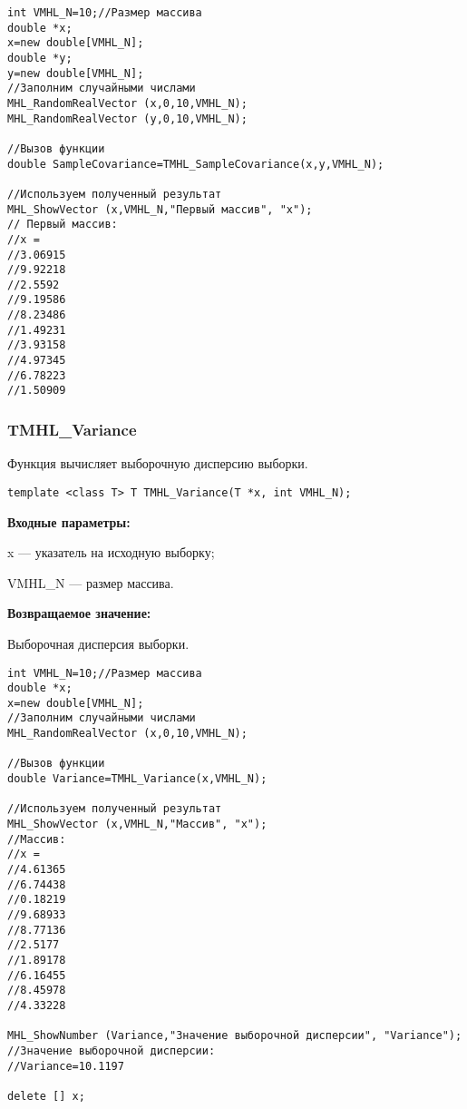 \documentclass[a4paper,12pt]{article}
\begin{document}
\begin{lstlisting}[label=code_use_TMHL_SampleCovariance,caption=Пример использования]
int VMHL_N=10;//Размер массива
double *x;
x=new double[VMHL_N];
double *y;
y=new double[VMHL_N];
//Заполним случайными числами
MHL_RandomRealVector (x,0,10,VMHL_N);
MHL_RandomRealVector (y,0,10,VMHL_N);

//Вызов функции
double SampleCovariance=TMHL_SampleCovariance(x,y,VMHL_N);

//Используем полученный результат
MHL_ShowVector (x,VMHL_N,"Первый массив", "x");
// Первый массив:
//x =
//3.06915
//9.92218
//2.5592
//9.19586
//8.23486
//1.49231
//3.93158
//4.97345
//6.78223
//1.50909
\end{lstlisting}

\subsubsection{TMHL\_Variance}\label{TMHL_Variance}

Функция вычисляет выборочную дисперсию выборки.


\begin{lstlisting}[label=code_syntax_TMHL_Variance,caption=Синтаксис]
template <class T> T TMHL_Variance(T *x, int VMHL_N);
\end{lstlisting}

\textbf{Входные параметры:}
 
x --- указатель на исходную выборку;
 
VMHL\_N --- размер массива.

\textbf{Возвращаемое значение:}
 
Выборочная дисперсия выборки.


\begin{lstlisting}[label=code_use_TMHL_Variance,caption=Пример использования]
int VMHL_N=10;//Размер массива
double *x;
x=new double[VMHL_N];
//Заполним случайными числами
MHL_RandomRealVector (x,0,10,VMHL_N);

//Вызов функции
double Variance=TMHL_Variance(x,VMHL_N);

//Используем полученный результат
MHL_ShowVector (x,VMHL_N,"Массив", "x");
//Массив:
//x =
//4.61365
//6.74438
//0.18219
//9.68933
//8.77136
//2.5177
//1.89178
//6.16455
//8.45978
//4.33228

MHL_ShowNumber (Variance,"Значение выборочной дисперсии", "Variance");
//Значение выборочной дисперсии:
//Variance=10.1197

delete [] x;
\end{lstlisting}
\end{document}
